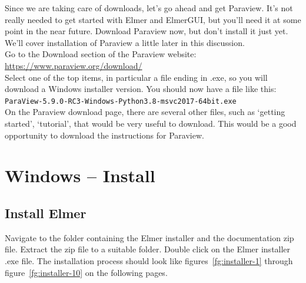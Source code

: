 Since we are taking care of downloads, let's go ahead and get Paraview.  It's not really needed to get started with Elmer and ElmerGUI, but you'll need it at some point in the near future.  Download Paraview now, but don't install it just yet.  We'll cover installation of Paraview a little later in this discussion.\\

Go to the Download section of the Paraview website:\\

 \url{https://www.paraview.org/download/}\\

Select one of the top items, in particular a file ending in .exe, so you will download a Windows installer version.  You should now have a file like this:\\

\texttt{ParaView-5.9.0-RC3-Windows-Python3.8-msvc2017-64bit.exe}\\

On the Paraview download page, there are several other files, such as `getting started', `tutorial', that would be very useful to download.  This would be a good opportunity to download the instructions for Paraview.


\chapter{Windows -- Install}

\section{Install Elmer}

Navigate to the folder containing the Elmer installer and the documentation zip file.  Extract the zip file to a suitable folder.  Double click on the Elmer installer .exe file.  The installation process should look like figures~\ref{fg:installer-1}  through figure~\ref{fg:installer-10} on the following pages.  

